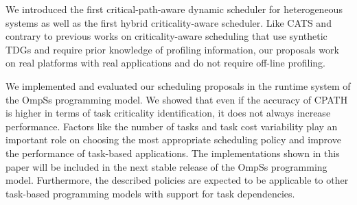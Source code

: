 We introduced the first critical-path-aware dynamic scheduler for heterogeneous systems as well as the first hybrid criticality-aware scheduler. Like CATS and contrary to previous works on criticality-aware scheduling that use synthetic TDGs and require prior knowledge of profiling information, our proposals work on real platforms with real applications and do not require off-line profiling.

We implemented and evaluated our scheduling proposals in the runtime system of the OmpSs programming model.
We showed that even if the accuracy of CPATH is higher in terms of task criticality identification, it does not always increase performance. 
Factors like the number of tasks and task cost variability play an important role on choosing the most appropriate scheduling policy and improve the performance of task-based applications.
The implementations shown in this paper will be included in the next stable release of the OmpSs programming model. 
Furthermore, the described policies are expected to be applicable to other task-based programming models with support for task dependencies. 

    

